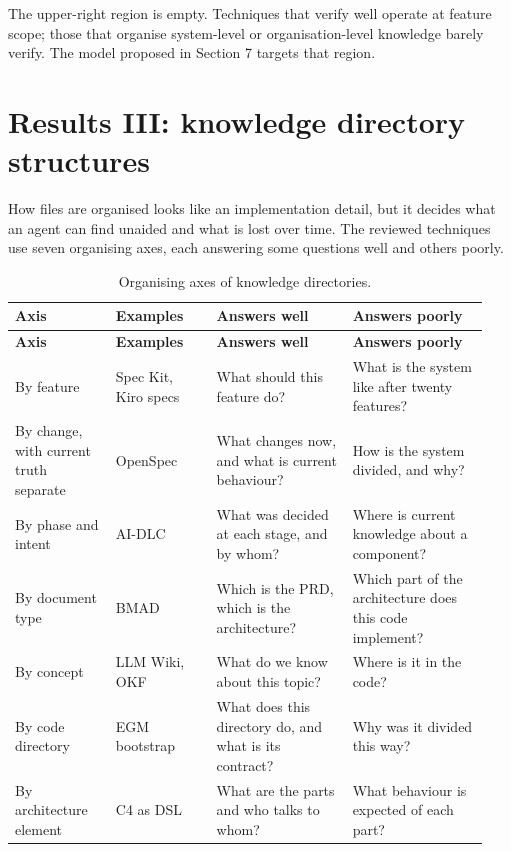 \documentclass[11pt]{article}
\begin{document}
The upper-right region is empty. Techniques that verify well operate at feature scope; those that organise system-level or organisation-level knowledge barely verify. The model proposed in Section 7 targets that region.

\section{Results III: knowledge directory structures}

How files are organised looks like an implementation detail, but it decides what an agent can find unaided and what is lost over time. The reviewed techniques use seven organising axes, each answering some questions well and others poorly.

\small
\begin{longtable}{p{0.2\linewidth}p{0.2\linewidth}p{0.27\linewidth}p{0.27\linewidth}}
\caption{Organising axes of knowledge directories.}\\
\toprule
\textbf{Axis} & \textbf{Examples} & \textbf{Answers well} & \textbf{Answers poorly} \\
\midrule
\endfirsthead
\toprule
\textbf{Axis} & \textbf{Examples} & \textbf{Answers well} & \textbf{Answers poorly} \\
\midrule
\endhead
By feature & Spec Kit, Kiro specs & What should this feature do? & What is the system like after twenty features? \\
By change, with current truth separate & OpenSpec & What changes now, and what is current behaviour? & How is the system divided, and why? \\
By phase and intent & AI-DLC & What was decided at each stage, and by whom? & Where is current knowledge about a component? \\
By document type & BMAD & Which is the PRD, which is the architecture? & Which part of the architecture does this code implement? \\
By concept & LLM Wiki, OKF & What do we know about this topic? & Where is it in the code? \\
By code directory & EGM bootstrap & What does this directory do, and what is its contract? & Why was it divided this way? \\
By architecture element & C4 as DSL & What are the parts and who talks to whom? & What behaviour is expected of each part? \\
\bottomrule
\end{longtable}
\normalsize
\end{document}
